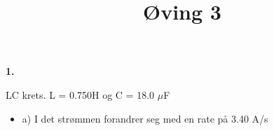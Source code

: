 \documentclass[11pt]{article}
\title{Øving 3}
\begin{document}
    \begin{flushleft}
        \textbf{1.}\par
        LC krets. L = 0.750H og C = 18.0 $\mu$F
        \par
        \begin{itemize}
            \item a) I det strømmen forandrer seg med en rate på 3.40 A/s
        \end{itemize}
        
        \bigskip
        




    \end{flushleft}
\end{document}
